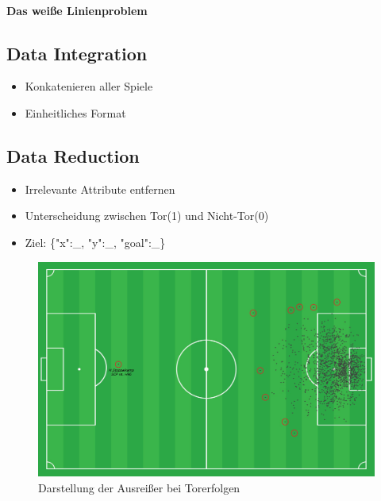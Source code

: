 \paragraph{Das weiße Linienproblem}
	
\subsection{Data Integration}
\label{datai}
	\begin{itemize}
	\item Konkatenieren aller Spiele
	\item Einheitliches Format
	\end{itemize}
	
\subsection{Data Reduction}
\label{datar}
	\begin{itemize}
	\item Irrelevante Attribute entfernen
	\item Unterscheidung zwischen Tor(1) und Nicht-Tor(0)
	\item Ziel: \{"x":\_, "y":\_, "goal":\_\}
	\end{itemize}
	

\begin{figure}
\centering
\includegraphics[scale=0.4]{se-wa-jpg/outlier_shots}
\caption[Darstellung der Ausreißer bei Torerfolgen]{Darstellung der Ausreißer bei Torerfolgen}
\label{outlier_shots}
\end{figure}

